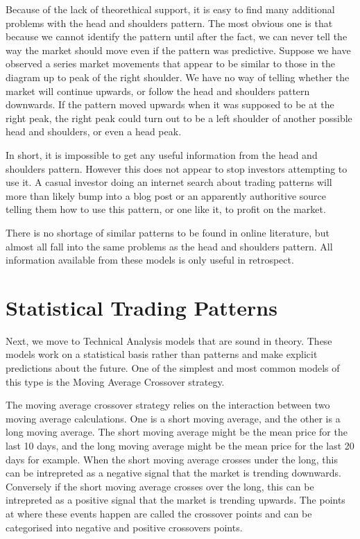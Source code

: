 \documentclass{report}
\begin{document}
Because of the lack of theorethical support, it is easy to find many additional problems with the head and shoulders pattern. The most obvious one is that because we cannot identify the pattern until after the fact, we can never tell the way the market should move even if the pattern was predictive. Suppose we have observed a series market movements that appear to be similar to those in the diagram up to peak of the right shoulder. We have no way of telling whether the market will continue upwards, or follow the head and shoulders pattern downwards. If the pattern moved upwards when it was supposed to be at the right peak, the right peak could turn out to be a left shoulder of another possible head and shoulders, or even a head peak.

In short, it is impossible to get any useful information from the head and shoulders pattern. However this does not appear to stop investors attempting to use it. A casual investor doing an internet search about trading patterns will more than likely bump into a blog post or an apparently authoritive source telling them how to use this pattern, or one like it, to profit on the market. 

There is no shortage of similar patterns to be found in online literature, but almost all fall into the same problems as the head and shoulders pattern. All information available from these models is only useful in retrospect. 

\section{Statistical Trading Patterns}

Next, we move to Technical Analysis models that are sound in theory. These models work on a statistical basis rather than patterns and make explicit predictions about the future. One of the simplest and most common models of this type is the Moving Average Crossover strategy.

The moving average crossover strategy relies on the interaction between two moving average calculations. One is a short moving average, and the other is a long moving average. The short moving average might be the mean price for the last 10 days, and the long moving average might be the mean price for the last 20 days for example. When the short moving average crosses under the long, this can be intrepreted as a negative signal that the market is trending downwards. Conversely if the short moving average crosses over the long, this can be intrepreted as a positive signal that the market is trending upwards. The points at where these events happen are called the crossover points and can be categorised into negative and positive crossovers points.
\end{document}
